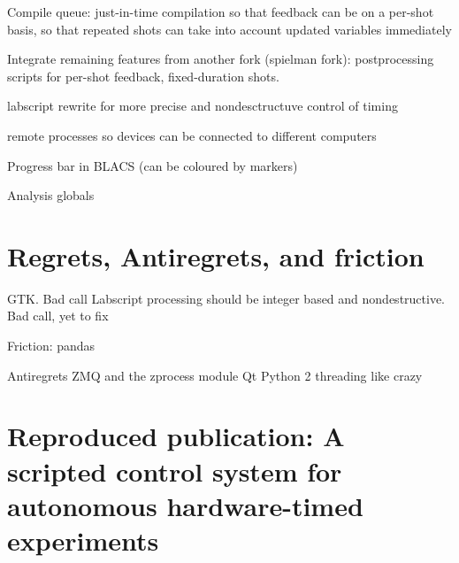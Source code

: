 Compile queue: just-in-time compilation so that feedback can be on a per-shot basis, so that repeated shots can take into account updated variables immediately

Integrate remaining features from another fork (spielman fork): postprocessing scripts for per-shot feedback, fixed-duration shots.

labscript rewrite for more precise and nondesctructuve control of timing

remote processes so devices can be connected to different computers

Progress bar in BLACS (can be coloured by markers)

Analysis globals

\section{Regrets, Antiregrets, and friction}
GTK. Bad call
Labscript processing should be integer based and nondestructive. Bad call, yet to fix

Friction:
pandas

Antiregrets
ZMQ and the zprocess module
Qt
Python 2
threading like crazy

\section{Reproduced publication: A scripted control system for autonomous hardware-timed experiments}

